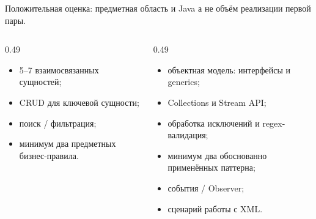 \begin{frame}{Положительная оценка: предметная область и Java}
   а не объём реализации первой пары.

  \medskip
  \begin{columns}[T]
    \begin{column}{0.49\textwidth}
      \begin{itemize}\setlength\itemsep{0.32em}
        \item 5--7 взаимосвязанных сущностей;
        \item CRUD для ключевой сущности;
        \item поиск / фильтрация;
        \item минимум два предметных бизнес-правила.
      \end{itemize}
    \end{column}
    \begin{column}{0.49\textwidth}
      \begin{itemize}\setlength\itemsep{0.32em}
        \item объектная модель: интерфейсы и generics;
        \item Collections и Stream API;
        \item обработка исключений и regex-валидация;
        \item минимум два обоснованно применённых паттерна;
        \item события / Observer;
        \item сценарий работы с XML.
      \end{itemize}
    \end{column}
  \end{columns}
\end{frame}
